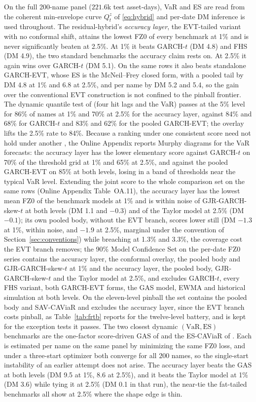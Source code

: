 \documentclass[11pt]{article}
\newcommand{\VaR}{\mathrm{VaR}}
\newcommand{\ES}{\mathrm{ES}}
\theoremstyle{remark}
\begin{document}
On the full 200-name panel ($221.6$k test asset-days), VaR and ES are read from the coherent min-envelope curve $Q^{z}_t$ of \eqref{eq:hybrid} and per-date DM inference is used throughout. The residual-hybrid's \emph{accuracy layer}, the EVT-tailed variant with no conformal shift, attains the lowest FZ0 of every benchmark at 1\% and is never significantly beaten at 2.5\%. At 1\% it beats GARCH-$t$ (DM 4.8) and FHS (DM 4.9), the two standard benchmarks the accuracy claim rests on. At 2.5\% it again wins over GARCH-$t$ (DM 5.1). On the same rows it also beats standalone GARCH-EVT, whose ES is the McNeil--Frey closed form, with a pooled tail by DM 4.8 at 1\% and 6.8 at 2.5\%, and per name by DM 5.2 and 5.4, so the gain over the conventional EVT construction is not confined to the pinball frontier. The dynamic quantile test of \citet{engle2004caviar} (four hit lags and the VaR) passes at the 5\% level for 86\% of names at 1\% and 70\% at 2.5\% for the accuracy layer, against 84\% and 68\% for GARCH-$t$ and 83\% and 62\% for the pooled GARCH-EVT; the overlay lifts the 2.5\% rate to 84\%. Because a ranking under one consistent score need not hold under another \citep{patton2020}, the Online Appendix reports Murphy diagrams \citep{ehm2016} for the VaR forecasts: the accuracy layer has the lower elementary score against GARCH-$t$ on 70\% of the threshold grid at 1\% and 65\% at 2.5\%, and against the pooled GARCH-EVT on 85\% at both levels, losing in a band of thresholds near the typical VaR level. Extending the joint score to the whole comparison set on the same rows (Online Appendix Table~OA.11), the accuracy layer has the lowest mean FZ0 of the benchmark models at 1\% and is within noise of GJR-GARCH-skew-$t$ at both levels (DM 1.1 and $-0.3$) and of the Taylor model at 2.5\% (DM $-0.1$); its own pooled body, without the EVT branch, scores lower still (DM $-1.3$ at 1\%, within noise, and $-1.9$ at 2.5\%, marginal under the convention of Section~\ref{sec:conventions}) while breaching at 1.3\% and 3.3\%, the coverage cost the EVT branch removes; the 90\% Model Confidence Set on the per-date FZ0 series contains the accuracy layer, the conformal overlay, the pooled body and GJR-GARCH-skew-$t$ at 1\% and the accuracy layer, the pooled body, GJR-GARCH-skew-$t$ and the Taylor model at 2.5\%, and excludes GARCH-$t$, every FHS variant, both GARCH-EVT forms, the GAS model, EWMA and historical simulation at both levels. On the eleven-level pinball the set contains the pooled body and SAV-CAViaR and excludes the accuracy layer, since the EVT branch costs pinball, as Table~\ref{tab:frtb} reports for the twelve-level battery, and is kept for the exception tests it passes. The two closest dynamic $(\VaR,\ES)$ benchmarks are the one-factor score-driven GAS of \citet{patton2019} and the ES-CAViaR of \citet{taylor2019}. Each is estimated per name on the same panel by minimizing the same FZ0 loss, and under a three-start optimizer both converge for all $200$ names, so the single-start instability of an earlier attempt does not arise. The accuracy layer beats the GAS at both levels (DM 9.5 at 1\%, 8.6 at 2.5\%), and it beats the Taylor model at 1\% (DM 3.6) while tying it at 2.5\% (DM 0.1 in that run), the near-tie the fat-tailed benchmarks all show at 2.5\% where the shape edge is thin.
\end{document}
